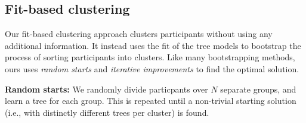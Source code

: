 %
%
%



\subsection{Fit-based clustering}
Our fit-based clustering approach clusters participants without using any additional information. It instead uses the fit of the tree models to bootstrap the process of sorting participants into clusters. Like many bootstrapping methods, ours uses \emph{random starts} and \emph{iterative improvements} to find the optimal solution.

\textbf{Random starts:} We randomly divide particpants over $N$ separate groups, and learn a tree for each group. This is repeated until a non-trivial starting solution (i.e., with distinctly different trees per cluster) is found. 

